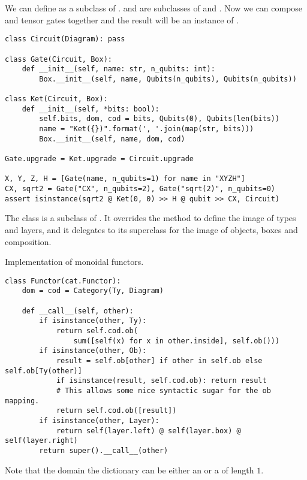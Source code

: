\begin{example}\label{example:circuit-diagrams}
We can define  as a subclass of .  and  are subclasses of  and .
Now we can compose and tensor gates together and the result will be an instance of .

\begin{verbatim}
class Circuit(Diagram): pass

class Gate(Circuit, Box):
    def __init__(self, name: str, n_qubits: int):
        Box.__init__(self, name, Qubits(n_qubits), Qubits(n_qubits))

class Ket(Circuit, Box):
    def __init__(self, *bits: bool):
        self.bits, dom, cod = bits, Qubits(0), Qubits(len(bits))
        name = "Ket({})".format(', '.join(map(str, bits)))
        Box.__init__(self, name, dom, cod)

Gate.upgrade = Ket.upgrade = Circuit.upgrade

X, Y, Z, H = [Gate(name, n_qubits=1) for name in "XYZH"]
CX, sqrt2 = Gate("CX", n_qubits=2), Gate("sqrt(2)", n_qubits=0)
assert isinstance(sqrt2 @ Ket(0, 0) >> H @ qubit >> CX, Circuit)
\end{verbatim}
\end{example}

The  class is a subclass of .
It overrides the  method to define the image of types and layers, and it delegates to its superclass for the image of objects, boxes and composition.

\begin{python}
{\normalfont Implementation of monoidal functors.}
\begin{verbatim}
class Functor(cat.Functor):
    dom = cod = Category(Ty, Diagram)

    def __call__(self, other):
        if isinstance(other, Ty):
            return self.cod.ob(
                sum([self(x) for x in other.inside], self.ob()))
        if isinstance(other, Ob):
            result = self.ob[other] if other in self.ob else self.ob[Ty(other)]
            if isinstance(result, self.cod.ob): return result
            # This allows some nice syntactic sugar for the ob mapping.
            return self.cod.ob([result])
        if isinstance(other, Layer):
            return self(layer.left) @ self(layer.box) @ self(layer.right)
        return super().__call__(other)
\end{verbatim}

Note that the domain the dictionary  can be either an  or a  of length $1$.
\end{python}

